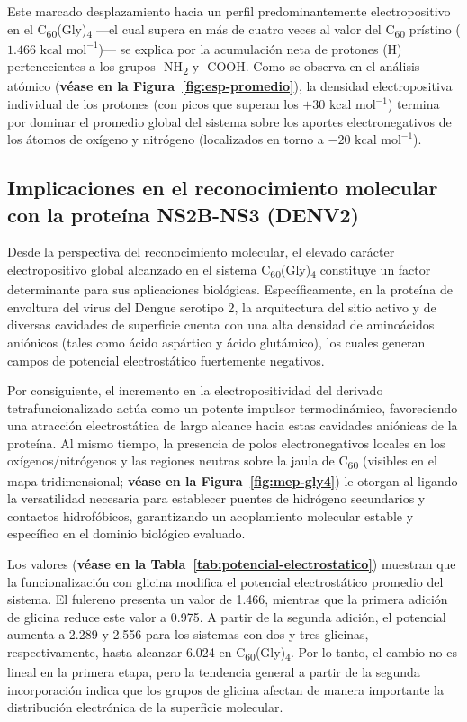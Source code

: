Este marcado desplazamiento hacia un perfil predominantemente electropositivo en el C\textsubscript{60}(Gly)\textsubscript{4} —el cual supera en más de cuatro veces al valor del C\textsubscript{60} prístino ($1.466\text{ kcal mol}^{-1}$)— se explica por la acumulación neta de protones (H) pertenecientes a los grupos -NH\textsubscript{2} y -COOH. Como se observa en el análisis atómico (\textbf{véase en la Figura~\ref{fig:esp-promedio}}), la densidad electropositiva individual de los protones (con picos que superan los $+30\text{ kcal mol}^{-1}$) termina por dominar el promedio global del sistema sobre los aportes electronegativos de los átomos de oxígeno y nitrógeno (localizados en torno a $-20\text{ kcal mol}^{-1}$).

\subsection{Implicaciones en el reconocimiento molecular con la proteína NS2B-NS3 (DENV2)}

Desde la perspectiva del reconocimiento molecular, el elevado carácter electropositivo global alcanzado en el sistema C\textsubscript{60}(Gly)\textsubscript{4} constituye un factor determinante para sus aplicaciones biológicas. Específicamente, en la proteína de envoltura del virus del Dengue serotipo 2, la arquitectura del sitio activo y de diversas cavidades de superficie cuenta con una alta densidad de aminoácidos aniónicos (tales como ácido aspártico y ácido glutámico), los cuales generan campos de potencial electrostático fuertemente negativos.

Por consiguiente, el incremento en la electropositividad del derivado tetrafuncionalizado actúa como un potente impulsor termodinámico, favoreciendo una atracción electrostática de largo alcance hacia estas cavidades aniónicas de la proteína. Al mismo tiempo, la presencia de polos electronegativos locales en los oxígenos/nitrógenos y las regiones neutras sobre la jaula de C\textsubscript{60} (visibles en el mapa tridimensional; \textbf{véase en la Figura~\ref{fig:mep-gly4}}) le otorgan al ligando la versatilidad necesaria para establecer puentes de hidrógeno secundarios y contactos hidrofóbicos, garantizando un acoplamiento molecular estable y específico en el dominio biológico evaluado.


Los valores (\textbf{véase en la Tabla~\ref{tab:potencial-electrostatico}}) muestran que la funcionalización con glicina modifica el potencial electrostático promedio del sistema. El fulereno presenta un valor de 1.466, mientras que la primera adición de glicina reduce este valor a 0.975. A partir de la segunda adición, el potencial aumenta a 2.289 y 2.556 para los sistemas con dos y tres glicinas, respectivamente, hasta alcanzar 6.024 en C\textsubscript{60}(Gly)\textsubscript{4}. Por lo tanto, el cambio no es lineal en la primera etapa, pero la tendencia general a partir de la segunda incorporación indica que los grupos de glicina afectan de manera importante la distribución electrónica de la superficie molecular.

